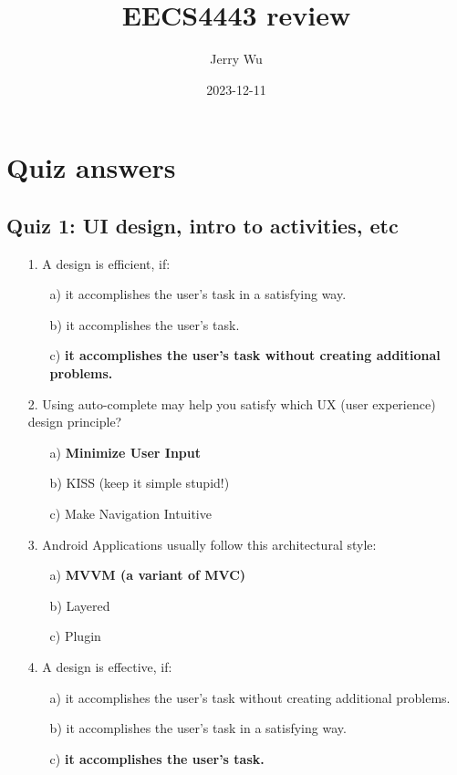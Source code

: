 \documentclass[12pt]{book}
\title{EECS4443 review}
\author{Jerry Wu}
\date{2023-12-11}
\begin{document}
\maketitle
\tableofcontents

\chapter{Quiz answers}

\section*{Quiz 1: UI design, intro to activities, etc}

\begin{itemize}
    \item[1.] A design is efficient, if:
    \begin{itemize}
        \item[a)] it accomplishes the user's task in a satisfying way.
        \item[b)] it accomplishes the user's task.
        \item[c)] \textbf{it accomplishes the user's task without creating additional problems.}

    \end{itemize}
    \item[2.] Using auto-complete may help you satisfy which UX (user experience) design principle?
    \begin{itemize}
        \item[a)] \textbf{Minimize User Input}
        \item[b)] KISS (keep it simple stupid!)
        \item[c)] Make Navigation Intuitive
    \end{itemize}
    
    \item[3.] Android Applications usually follow this architectural style:
    \begin{itemize}
        \item[a)] \textbf{MVVM (a variant of MVC)}
        \item[b)] Layered
        \item[c)] Plugin
    \end{itemize}
    
    \item[4.] A design is effective, if:
    \begin{itemize}
        \item[a)] it accomplishes the user's task without creating additional problems.
        \item[b)] it accomplishes the user's task in a satisfying way.
        \item[c)] \textbf{it accomplishes the user's task.}
    \end{itemize}
    

\end{itemize}
\end{document}
